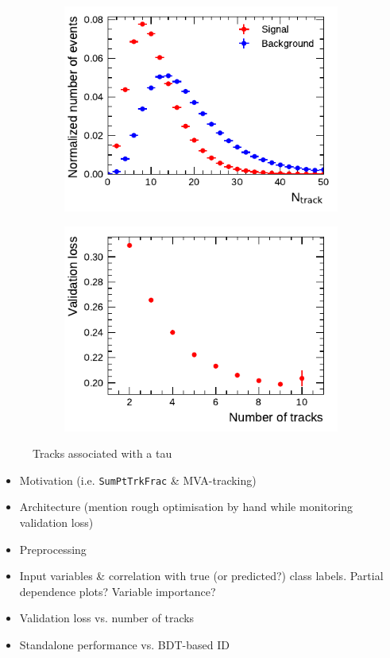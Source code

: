 \begin{figure}[ht]
  \begin{subfigure}{0.5\textwidth}
    \centering
    \includegraphics{./figures/rnn/ntrk_1p.pdf}
  \end{subfigure}%
  \begin{subfigure}{0.5\textwidth}
    \centering
    \includegraphics{./figures/rnn/nscan/track_1p.pdf}
  \end{subfigure}
  \caption{Tracks associated with a tau}
  \label{fig:rnn_ntracks}
\end{figure}

\begin{itemize}
\item Motivation (i.e. \texttt{SumPtTrkFrac} \& MVA-tracking)
\item Architecture (mention rough optimisation by hand while monitoring
  validation loss)
\item Preprocessing
\item Input variables \& correlation with true (or predicted?) class labels.
  Partial dependence plots? Variable importance?
\item Validation loss vs. number of tracks
\item Standalone performance vs. BDT-based ID
\end{itemize}

